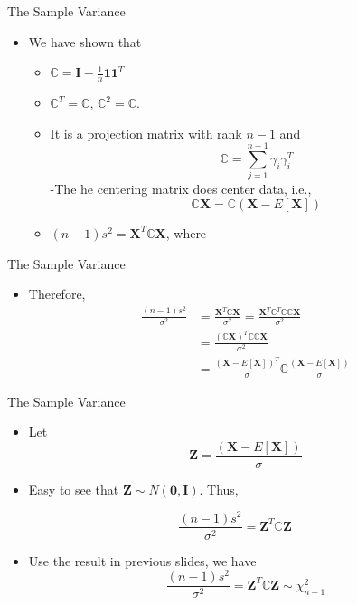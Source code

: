 \documentclass[
  ignorenonframetext,
]{beamer}
\providecommand{\tightlist}{%
  \setlength{\itemsep}{0pt}\setlength{\parskip}{0pt}}
\begin{document}
\begin{frame}{The Sample Variance}
\protect\hypertarget{the-sample-variance}{}
\begin{itemize}
\tightlist
\item
  We have shown that

  \begin{itemize}
  \tightlist
  \item
    \(\mathbb C = \mathbf I - \frac{1}{n} \mathbf 1 \mathbf 1^T\)
  \item
    \(\mathbb C^T=\mathbb C\), \(\mathbb C^2=\mathbb C\).
  \item
    It is a projection matrix with rank \(n-1\) and
    \[\mathbb C = \sum_{j=1}^{n-1}\gamma_i\gamma_i^T\] -The he centering
    matrix does center data, i.e.,
    \[\mathbb C \mathbf X = \mathbb C (\mathbf X - E[\mathbf X])\]
  \item
    \((n-1)s^2=\mathbf X^T\mathbb C \mathbf X\), where
  \end{itemize}
\end{itemize}
\end{frame}

\begin{frame}{The Sample Variance}
\protect\hypertarget{the-sample-variance-1}{}
\begin{itemize}
\tightlist
\item
  Therefore, \[
  \begin{aligned}
  \frac{(n-1)s^2}{\sigma^2}&=\frac{\mathbf X^T \mathbb C \mathbf X}{\sigma^2}=\frac{\mathbf X^T \mathbb C^T \mathbb C \mathbb C \mathbf X}{\sigma^2}\\
  &=\frac{(\mathbb C\mathbf X)^T  \mathbb C \mathbb C\mathbf X}{\sigma^2}\\
  &=\frac{(\mathbf X - E[\mathbf X])^T}{\sigma}\mathbb C  \frac{(\mathbf X - E[\mathbf X])}{\sigma}
  \end{aligned}\]
\end{itemize}
\end{frame}

\begin{frame}{The Sample Variance}
\protect\hypertarget{the-sample-variance-2}{}
\begin{itemize}
\tightlist
\item
  Let \[\mathbf Z=\frac{(\mathbf X - E[\mathbf X])}{\sigma}\]
\item
  Easy to see that \(\mathbf Z\sim N(\mathbf 0, \mathbf I)\). Thus,
\end{itemize}

\[\frac{(n-1)s^2}{\sigma^2}=\mathbf Z^T \mathbb C \mathbf Z\]

\begin{itemize}
\tightlist
\item
  Use the result in previous slides, we have
  \[\frac{(n-1)s^2}{\sigma^2}=\mathbf Z^T \mathbb C \mathbf Z \sim \chi_{n-1}^2\]
\end{itemize}
\end{frame}
\end{document}
